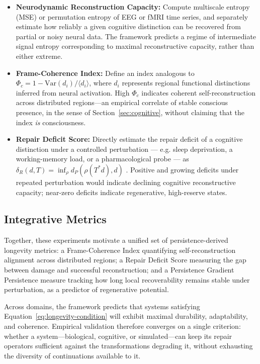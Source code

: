\documentclass[12pt]{article}
\begin{document}
\begin{itemize}[leftmargin=*]
\item \textbf{Neurodynamic Reconstruction Capacity:} Compute multiscale entropy (MSE) or permutation entropy of EEG or fMRI time series, and separately estimate how reliably a given cognitive distinction can be recovered from partial or noisy neural data. The framework predicts a regime of intermediate signal entropy corresponding to maximal reconstructive capacity, rather than either extreme.

\item \textbf{Frame-Coherence Index:} Define an index analogous to $\Phi_c = 1 - \mathrm{Var}(d_i)/\langle d_i \rangle$, where $d_i$ represents regional functional distinctions inferred from neural activation. High $\Phi_c$ indicates coherent self-reconstruction across distributed regions---an empirical correlate of stable conscious presence, in the sense of Section~\ref{sec:cognitive}, without claiming that the index \emph{is} consciousness.

\item \textbf{Repair Deficit Score:} Directly estimate the repair deficit of a cognitive distinction under a controlled perturbation --- e.g. sleep deprivation, a working-memory load, or a pharmacological probe --- as $\delta_R(d,T) = \inf_\rho d_P(\rho(T^*d), d)$ \cite{flyxion2026persistence}. Positive and growing deficits under repeated perturbation would indicate declining cognitive reconstructive capacity; near-zero deficits indicate regenerative, high-reserve states.
\end{itemize}

\subsection{Integrative Metrics}

Together, these experiments motivate a unified set of persistence-derived longevity metrics: a Frame-Coherence Index quantifying self-reconstruction alignment across distributed regions; a Repair Deficit Score measuring the gap between damage and successful reconstruction; and a Persistence Gradient Persistence measure tracking how long local recoverability remains stable under perturbation, as a predictor of regenerative potential.

Across domains, the framework predicts that systems satisfying Equation~\eqref{eq:longevity-condition} will exhibit maximal durability, adaptability, and coherence. Empirical validation therefore converges on a single criterion: whether a system---biological, cognitive, or simulated---can keep its repair operators sufficient against the transformations degrading it, without exhausting the diversity of continuations available to it.
\end{document}
